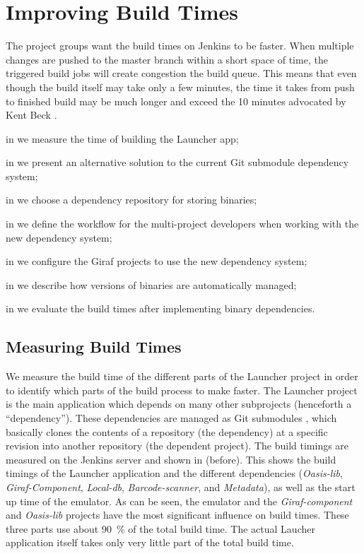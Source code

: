 \chapter{Improving Build Times}
The project groups want the build times on Jenkins to be faster. When multiple changes are pushed to the master branch within a short space of time, the triggered build jobs will create congestion the build queue. This means that even though the build itself may take only a few minutes, the time it takes from push to finished build may be much longer and exceed the 10 minutes advocated by Kent Beck \parencite{beck2004}.

\begin{chapterorganization}
  \item in  we measure the time of building the Launcher app;
  \item in  we present an alternative solution to the current Git submodule dependency system;
  \item in  we choose a dependency repository for storing binaries;
  \item in  we define the workflow for the multi-project developers when working with the new dependency system;
  \item in  we configure the Giraf projects to use the new dependency system;
  \item in  we describe how versions of binaries are automatically managed;
  \item in  we evaluate the build times after implementing binary dependencies.
\end{chapterorganization}

\section{Measuring Build Times}\label{sec:measuring_build_times}
We measure the build time of the different parts of the Launcher project in order to identify which parts of the build process to make faster. The Launcher project is the main application which depends on many other subprojects (henceforth a ``dependency''). These dependencies are managed as Git submodules \parencite{git-submodules-doc}, which basically clones the contents of a repository (the dependency) at a specific revision into another repository (the dependent project). The build timings are measured on the Jenkins server and shown in  (before). This shows the build timings of the Launcher application and the different dependencies (\emph{Oasis-lib}, \emph{Giraf-Component}, \emph{Local-db}, \emph{Barcode-scanner}, and \emph{Metadata}), as well as the start up time of the emulator. As can be seen, the emulator and the \emph{Giraf-component} and \emph{Oasis-lib} projects have the most significant influence on build times. These three parts use about \SI{90}{\percent} of the total build time. The actual Laucher application itself takes only very little part of the total build time.

